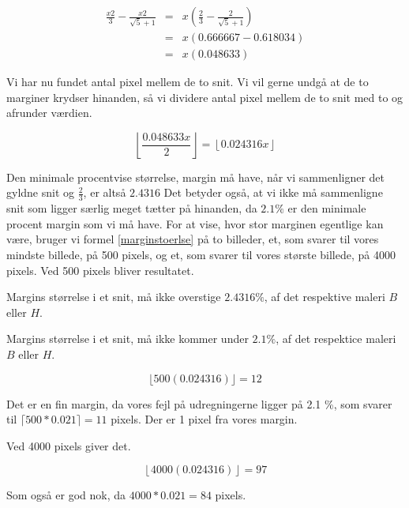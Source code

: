 \begin{eqnarray}
	\frac{x2}{3} - \frac{x2}{\sqrt{5}+1} & = & x(\frac{2}{3} - \frac{2}{\sqrt{5} + 1}) \nonumber \\
	& = & x(0.666667-0.618034) \\ \nonumber
	& = & x(0.048633)
\end{eqnarray}

Vi har nu fundet antal pixel mellem de to snit. Vi vil gerne undgå at
de to marginer krydser hinanden, så vi dividere antal pixel mellem de to snit med to og afrunder værdien.

\begin{equation}
	\left\lfloor \frac{0.048633x}{2}\right\rfloor = \left\lfloor0.024316x \right\rfloor
	\label{marginstoerlse}
\end{equation}

Den minimale procentvise størrelse, margin må have, når vi
sammenligner det gyldne snit og $\frac{2}{3}$, er altså $2.4316$ Det
betyder også, at vi ikke må sammenligne snit som ligger særlig meget
tætter på hinanden, da $2.1\%$ er den minimale procent margin som vi må
have. For at vise, hvor stor marginen egentlige kan være, bruger vi formel \ref{marginstoerlse} på to billeder, et, som svarer til vores mindste billede, på
500 pixels, og et, som svarer til vores største billede, på 4000 pixels. Ved
500 pixels bliver resultatet.

\begin{definition}
	Margins størrelse i et snit, må ikke overstige $2.4316 \%$, af det respektive maleri $B$ eller $H$.
	\label{margin_max}
\end{definition}

\begin{definition}
	Margins størrelse i et snit, må ikke kommer under $2.1 \%$, af det respektice maleri $B$ eller $H$.
	\label{margin_min}
\end{definition}

\begin{equation}
	 \lfloor 500(0.024316)\rfloor = 12
\end{equation}

Det er en fin margin, da vores fejl på udregningerne ligger på 2.1 \%,
som svarer til $\lceil 500*0.021 \rceil = 11$ pixels. Der er 1 pixel fra vores
margin.

Ved 4000 pixels giver det.

\begin{equation}
	 \left\lfloor 4000(0.024316)\right\rfloor = 97
\end{equation}

Som også er god nok, da $4000*0.021 = 84$ pixels.
